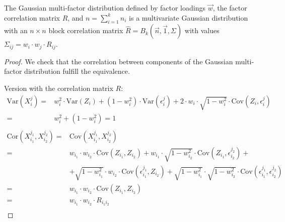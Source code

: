 \documentclass[11pt,fleqn]{book} %
\begin{document}
\begin{proposition}
	\label{prop:gmfigs}
	The Gaussian multi-factor distribution defined by factor loadings $\vec{w}$,
	the factor correlation matrix $R$, and $n = \sum_{i=1}^k n_i$ is a 
	multivariate Gaussian distribution with an $n {\times} n$ block 
	correlation matrix $\widehat{R}=B_k(\vec{n},\vec{1},\Sigma)$ 
	with values $\Sigma_{ij} = w_i \cdot w_j \cdot R_{ij}$.
\end{proposition}
\begin{proof}
	We check that the correlation between components of the Gaussian multi-factor 
	distribution fulfill the equivalence.
	
	Version with the correlation matrix $R$:
	\begin{displaymath}
		\begin{array}{rl}
			\text{Var}(X_i^j) =                       &
			w_i^2 \cdot \text{Var}(Z_i) + (1-w_i^2) \cdot \text{Var}(\epsilon_i^j) +
			2 \cdot w_i \cdot \sqrt{1-w_i^2} \cdot \text{Cov}(Z_i, \epsilon_i^j)    \\
			=                                         & w_i^2 + (1-w_i^2) = 1       \\
		\end{array}
	\end{displaymath}
	\begin{displaymath}
		\begin{array}{rl}
			\text{Cor}(X_{i_1}^{j_1},X_{i_2}^{j_2}) = & \text{Cov}(X_{i_1}^{j_1},X_{i_2}^{j_2})                                               \\
			=                                         & w_{i_1} \cdot w_{i_2} \cdot \text{Cov}(Z_{i_1},Z_{i_2}) +
			                                            w_{i_1} \cdot \sqrt{1-w_{i_2}^2} \cdot \text{Cov}(Z_{i_1}, \epsilon_{i_2}^{j_2}) +    \\
			                                          & + \sqrt{1-w_{i_1}^2} \cdot w_{i_2} \cdot \text{Cov}(\epsilon_{i_1}^{j_1}, Z_{i_2}) +
			                                            \sqrt{1-w_{i_1}^2} \cdot \sqrt{1-w_{i_2}^2} \cdot 
			                                            \text{Cov}(\epsilon_{i_1}^{j_1}, \epsilon_{i_2}^{j_2})                                \\
			=                                         & w_{i_1} \cdot w_{i_2} \cdot \text{Cov}(Z_{i_1}, Z_{i_2})                              \\
			=                                         & w_{i_1} \cdot w_{i_2} \cdot R_{i_1i_2}                                                \\

\end{array}
\end{displaymath}
\end{proof}
\end{document}
